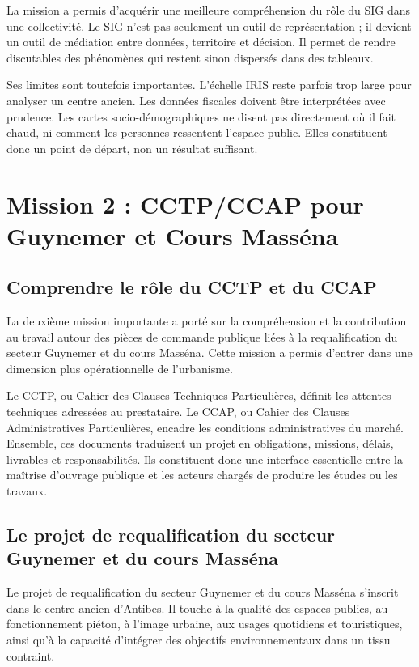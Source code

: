 \documentclass[11pt,a4paper]{report}
\begin{document}
La mission a permis d'acquérir une meilleure compréhension du rôle du SIG dans une collectivité. Le SIG n'est pas seulement un outil de représentation ; il devient un outil de médiation entre données, territoire et décision. Il permet de rendre discutables des phénomènes qui restent sinon dispersés dans des tableaux.

Ses limites sont toutefois importantes. L'échelle IRIS reste parfois trop large pour analyser un centre ancien. Les données fiscales doivent être interprétées avec prudence. Les cartes socio-démographiques ne disent pas directement où il fait chaud, ni comment les personnes ressentent l'espace public. Elles constituent donc un point de départ, non un résultat suffisant.

\section{Mission 2 : CCTP/CCAP pour Guynemer et Cours Masséna}

\subsection{Comprendre le rôle du CCTP et du CCAP}

La deuxième mission importante a porté sur la compréhension et la contribution au travail autour des pièces de commande publique liées à la requalification du secteur Guynemer et du cours Masséna. Cette mission a permis d'entrer dans une dimension plus opérationnelle de l'urbanisme.

Le CCTP, ou Cahier des Clauses Techniques Particulières, définit les attentes techniques adressées au prestataire. Le CCAP, ou Cahier des Clauses Administratives Particulières, encadre les conditions administratives du marché. Ensemble, ces documents traduisent un projet en obligations, missions, délais, livrables et responsabilités. Ils constituent donc une interface essentielle entre la maîtrise d'ouvrage publique et les acteurs chargés de produire les études ou les travaux.

\subsection{Le projet de requalification du secteur Guynemer et du cours Masséna}

Le projet de requalification du secteur Guynemer et du cours Masséna s'inscrit dans le centre ancien d'Antibes. Il touche à la qualité des espaces publics, au fonctionnement piéton, à l'image urbaine, aux usages quotidiens et touristiques, ainsi qu'à la capacité d'intégrer des objectifs environnementaux dans un tissu contraint.
\end{document}
